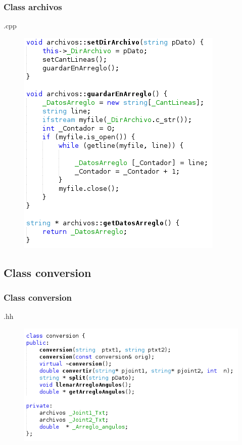 \documentclass{beamer}
\begin{document}



\begin{frame}
\frametitle{Class archivos}
.cpp

\begin{figure}
\includegraphics[width=0.45\linewidth]{15.png}
\end{figure}


\end{frame}




\subsection{Class conversion}

\begin{frame}
\frametitle{Class conversion}
.hh

\begin{figure}
\includegraphics[width=0.7\linewidth]{16.png}
\end{figure}


\end{frame}

\end{document}
